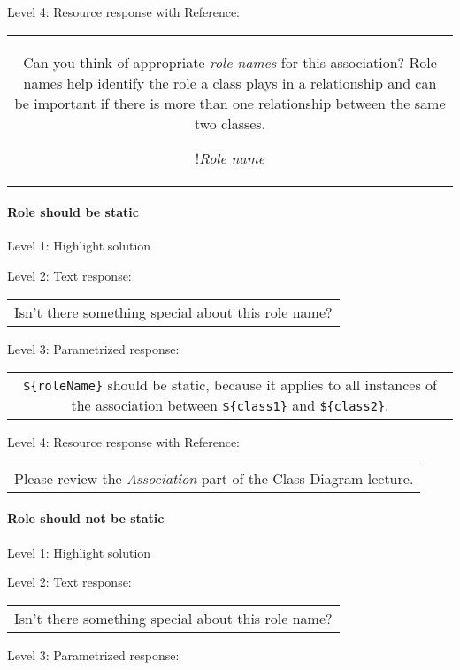 \noindent Level 4: Resource response with Reference:

\begin{tabular}{|c}
Can you think of appropriate \textit{role names}
for this association? Role names help identify the role a class plays in a
relationship and can be important if there is more than one relationship
between the same two classes.

!\textit{Role name}

\end{tabular} \medskip


\paragraph{Role should be static}

\noindent Level 1: Highlight solution \medskip

\noindent Level 2: Text response: \medskip

\begin{tabular}{|c}
Isn't there something special about this role name?
\end{tabular} \medskip

\noindent Level 3: Parametrized response: \medskip

\begin{tabular}{|c}
\verb|${roleName}| should be static, because it applies to all instances of the association between \verb|${class1}| and \verb|${class2}|.
\end{tabular} \medskip

\noindent Level 4: Resource response with Reference:

\begin{tabular}{|c}
Please review the \textit{Association} part of the Class Diagram lecture.
\end{tabular} \medskip


\paragraph{Role should not be static}

\noindent Level 1: Highlight solution \medskip

\noindent Level 2: Text response: \medskip

\begin{tabular}{|c}
Isn't there something special about this role name?
\end{tabular} \medskip

\noindent Level 3: Parametrized response: \medskip

